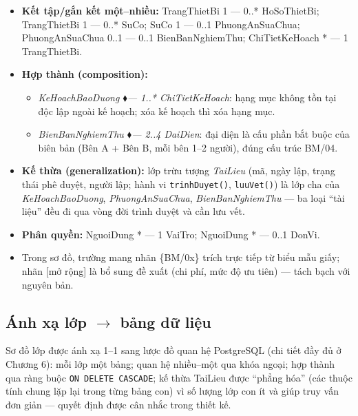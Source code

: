 \begin{itemize}
  \item \textbf{Kết tập/gắn kết một--nhiều:} TrangThietBi 1 --- 0..* HoSoThietBi; TrangThietBi 1 --- 0..* SuCo; SuCo 1 --- 0..1 PhuongAnSuaChua; PhuongAnSuaChua 0..1 --- 0..1 BienBanNghiemThu; ChiTietKeHoach * --- 1 TrangThietBi.
  \item \textbf{Hợp thành (composition):}
  \begin{itemize}
    \item \emph{KeHoachBaoDuong $\blacklozenge$--- 1..* ChiTietKeHoach}: hạng mục không tồn tại độc lập ngoài kế hoạch; xóa kế hoạch thì xóa hạng mục.
    \item \emph{BienBanNghiemThu $\blacklozenge$--- 2..4 DaiDien}: đại diện là cấu phần bắt buộc của biên bản (Bên A + Bên B, mỗi bên 1--2 người), đúng cấu trúc BM/04.
  \end{itemize}
  \item \textbf{Kế thừa (generalization):} lớp trừu tượng \emph{TaiLieu} (mã, ngày lập, trạng thái phê duyệt, người lập; hành vi \texttt{trinhDuyet()}, \texttt{luuVet()}) là lớp cha của \emph{KeHoachBaoDuong}, \emph{PhuongAnSuaChua}, \emph{BienBanNghiemThu} — ba loại ``tài liệu'' đều đi qua vòng đời trình duyệt và cần lưu vết.
  \item \textbf{Phân quyền:} NguoiDung * --- 1 VaiTro; NguoiDung * --- 0..1 DonVi.
  \item Trong sơ đồ, trường mang nhãn \{BM/0x\} trích trực tiếp từ biểu mẫu giấy; nhãn [mở rộng] là bổ sung đề xuất (chi phí, mức độ ưu tiên) — tách bạch với nguyên bản.
\end{itemize}

\subsection{Ánh xạ lớp $\rightarrow$ bảng dữ liệu}

Sơ đồ lớp được ánh xạ 1--1 sang lược đồ quan hệ PostgreSQL (chi tiết đầy đủ ở Chương 6): mỗi lớp một bảng; quan hệ nhiều--một qua khóa ngoại; hợp thành qua ràng buộc \texttt{ON DELETE CASCADE}; kế thừa TaiLieu được ``phẳng hóa'' (các thuộc tính chung lặp lại trong từng bảng con) vì số lượng lớp con ít và giúp truy vấn đơn giản — quyết định được cân nhắc trong thiết kế.
